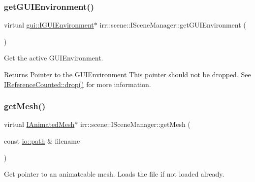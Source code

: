 \subsubsection{\texorpdfstring{get\+G\+U\+I\+Environment()}{getGUIEnvironment()}\hspace{0.1cm}{\footnotesize\ttfamily [2/2]}}
{\footnotesize\ttfamily virtual \hyperlink{classirr_1_1gui_1_1IGUIEnvironment}{gui\+::\+I\+G\+U\+I\+Environment}$\ast$ irr\+::scene\+::\+I\+Scene\+Manager\+::get\+G\+U\+I\+Environment (\begin{DoxyParamCaption}{ }\end{DoxyParamCaption})\hspace{0.3cm}{\ttfamily [pure virtual]}}



Get the active G\+U\+I\+Environment. 

\begin{DoxyReturn}{Returns}
Pointer to the G\+U\+I\+Environment This pointer should not be dropped. See \hyperlink{classirr_1_1IReferenceCounted_a03856a09355b89d178090c4a5f738543}{I\+Reference\+Counted\+::drop()} for more information. 
\end{DoxyReturn}
\mbox{\label{classirr_1_1scene_1_1ISceneManager_a63894c3f3d46cfc385116f1705935e03}} 
\subsubsection{\texorpdfstring{get\+Mesh()}{getMesh()}\hspace{0.1cm}{\footnotesize\ttfamily [1/4]}}
{\footnotesize\ttfamily virtual \hyperlink{classirr_1_1scene_1_1IAnimatedMesh}{I\+Animated\+Mesh}$\ast$ irr\+::scene\+::\+I\+Scene\+Manager\+::get\+Mesh (\begin{DoxyParamCaption}\item[{const \hyperlink{namespaceirr_1_1io_a6468281622ce3a1c46b72e19f32dded5}{io\+::path} \&}]{filename }\end{DoxyParamCaption})\hspace{0.3cm}{\ttfamily [pure virtual]}}



Get pointer to an animateable mesh. Loads the file if not loaded already. 

